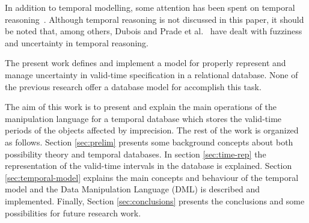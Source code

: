 In addition to temporal modelling, some attention has been spent on temporal reasoning~\cite{Allen1983}. Although temporal reasoning is not discussed in this paper, it should be noted that, among others, Dubois and Prade et al.~\cite{Dubois2003,DuBois1989} have dealt with fuzziness and uncertainty in temporal reasoning.

The present work defines and implement a model for properly represent and manage uncertainty in valid-time specification in a relational database. None of the previous research offer a database model for accomplish this task.

The aim of this work is to present and explain the main operations of the manipulation language for a temporal database which stores the valid-time periods of the objects affected by imprecision. The rest of the work is organized as follows. Section \ref{sec:prelim} presents some background concepts about both possibility theory and temporal databases. In section \ref{sec:time-rep} the representation of the valid-time intervals in the database is explained. Section \ref{sec:temporal-model} explains the main concepts and behaviour of the temporal model and the Data Manipulation Language (DML) is described and implemented. Finally, Section \ref{sec:conclusions} presents the conclusions and some possibilities for future research work.



